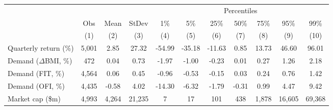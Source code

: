 \begin{tabular}{lcccccccccc}
  \hline & & & & \multicolumn{7}{c}{Percentiles} \\
   \cmidrule(l){5-11}
 & Obs & Mean & StDev & 1\% & 5\% & 25\% & 50\% & 75\% & 95\% & 99\% \\ 
   \cmidrule(l){2-4}
 \cmidrule(l){5-11}
 & (1) & (2) & (3) & (4) & (5) & (6) & (7) & (8) & (9) & (10) \\ 
  Quarterly return (\%) & 5,001 & 2.85 & 27.32 & -54.99 & -35.18 & -11.63 & 0.85 & 13.73 & 46.60 & 96.01 \\ 
  Demand ($\Delta$BMI, \%) & 472 & 0.04 & 0.73 & -1.97 & -1.00 & -0.23 & 0.01 & 0.27 & 1.26 & 2.18 \\ 
  Demand (FIT, \%) & 4,564 & 0.06 & 0.45 & -0.96 & -0.53 & -0.15 & 0.03 & 0.24 & 0.76 & 1.42 \\ 
  Demand (OFI, \%) & 4,435 & -0.58 & 4.02 & -14.30 & -6.32 & -1.79 & -0.31 & 0.99 & 4.47 & 9.42 \\ 
  Market cap (\$m) & 4,993 & 4,264 & 21,235 & 7 & 17 & 101 & 438 & 1,878 & 16,605 & 69,368 \\ 
   \hline 
\end{tabular}
